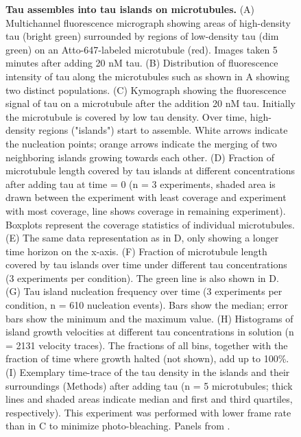 \begin{figure}[t!]
\caption[Tau assembles into tau islands on microtubules.]{\textbf{Tau assembles into tau islands on microtubules.} (A) Multichannel fluorescence micrograph showing areas of high-density tau (bright green) surrounded by regions of low-density tau (dim green) on an Atto-647-labeled microtubule (red). Images taken 5 minutes after adding 20 nM tau. (B) Distribution of fluorescence intensity of tau along the microtubules such as shown in A showing two distinct populations. (C) Kymograph showing the fluorescence signal of tau on a microtubule after the addition 20 nM tau. Initially the microtubule is covered by low tau density. Over time, high-density regions ("islands") start to assemble. White arrows indicate the nucleation points; orange arrows indicate the merging of two neighboring islands growing towards each other. (D) Fraction of microtubule length covered by tau islands at different concentrations after adding tau at time = 0 (n = 3 experiments, shaded area is drawn between the experiment with least coverage and experiment with most coverage, line shows coverage in remaining experiment). Boxplots represent the coverage statistics of individual microtubules. (E) The same data representation as in D, only showing a longer time horizon on the x-axis. (F) Fraction of microtubule length covered by tau islands over time under different tau concentrations (3 experiments per condition). The green line is also shown in D. (G) Tau island nucleation frequency over time (3 experiments per condition, n = 610 nucleation events). Bars show the median; error bars show the minimum and the maximum value. (H) Histograms of island growth velocities at different tau concentrations in solution (n = 2131 velocity traces). The fractions of all bins, together with the fraction of time where growth halted (not shown), add up to 100\%. (I) Exemplary time-trace of the tau density in the islands and their surroundings (Methods) after adding tau (n = 5 microtubules; thick lines and shaded areas indicate median and first and third quartiles, respectively). This experiment was performed with lower frame rate than in C to minimize photo-bleaching. Panels from \cite{Siahaan2019a}.
	}\label{tauGROW}
\end{figure}

